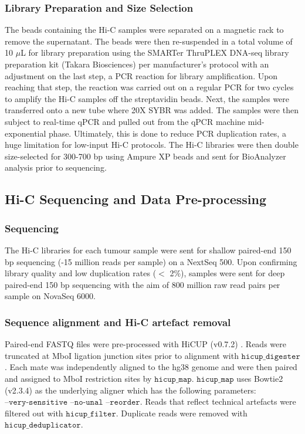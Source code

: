 \subsubsection{Library Preparation and Size Selection}

The beads containing the Hi-C samples were separated on a magnetic rack to remove the supernatant.
The beads were then re-suspended in a total volume of 10 $\mu$L for library preparation using the SMARTer ThruPLEX DNA-seq library preparation kit (Takara Biosciences) per manufacturer's protocol with an adjustment on the last step, a PCR reaction for library amplification.
Upon reaching that step, the reaction was carried out on a regular PCR for two cycles to amplify the Hi-C samples off the streptavidin beads.
Next, the samples were transferred onto a new tube where 20X SYBR was added.
The samples were then subject to real-time qPCR and pulled out from the qPCR machine mid-exponential phase.
Ultimately, this is done to reduce PCR duplication rates, a huge limitation for low-input Hi-C protocols.
The Hi-C libraries were then double size-selected for 300-700 bp using Ampure XP beads and sent for BioAnalyzer analysis prior to sequencing.

\subsection{Hi-C Sequencing and Data Pre-processing}

\subsubsection{Sequencing}

The Hi-C libraries for each tumour sample were sent for shallow paired-end 150 bp sequencing (-15 million reads per sample) on a NextSeq 500.
Upon confirming library quality and low duplication rates ($<$ 2\%), samples were sent for deep paired-end 150 bp sequencing with the aim of 800 million raw read pairs per sample on NovaSeq 6000.

\subsubsection{Sequence alignment and Hi-C artefact removal}

Paired-end FASTQ files were pre-processed with HiCUP (v0.7.2) \cite{wingettHiCUPPipelineMapping2015}.
Reads were truncated at MboI ligation junction sites prior to alignment with $\texttt{hicup\_digester}$.
Each mate was independently aligned to the hg38 genome and were then paired and assigned to MboI restriction sites by $\texttt{hicup\_map}$.
$\texttt{hicup\_map}$ uses Bowtie2 (v2.3.4) \cite{langmeadFastGappedreadAlignment2012} as the underlying aligner which has the following parameters: $\texttt{--very-sensitive --no-unal --reorder}$.
Reads that reflect technical artefacts were filtered out with $\texttt{hicup\_filter}$.
Duplicate reads were removed with $\texttt{hicup\_deduplicator}$.

